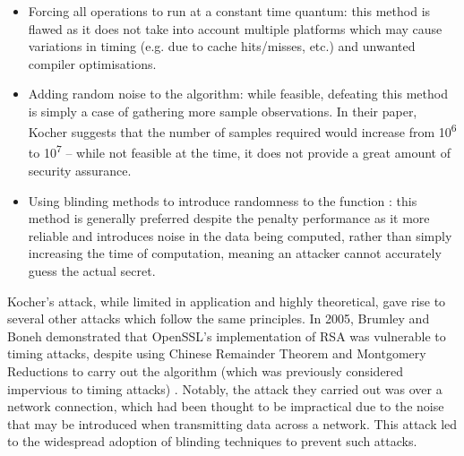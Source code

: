 \documentclass[a4paper,oneside,11pt]{article}
\begin{document}
\begin{itemize}
	\item{Forcing all operations to run at a constant time quantum: this
		method is flawed as it does not take into account multiple
		platforms which may cause variations in timing (e.g. due to
		cache hits/misses, etc.) and unwanted compiler optimisations.}
	\item{Adding random noise to the algorithm: while feasible, defeating
		this method is simply a case of gathering more sample
		observations. In their paper, Kocher suggests that the number
		of samples required would increase from 10\textsuperscript{6}
		to 10\textsuperscript{7} -- while not feasible at the time, it
		does not provide a great amount of security assurance.}
	\item{Using blinding methods to introduce randomness to the function
		\cite{A/Chaum-1983-Blinding}: this method is generally
		preferred despite the penalty performance as it more reliable
		and introduces noise in the data being computed, rather than
		simply increasing the time of computation, meaning an attacker
		cannot accurately guess the actual secret.}
\end{itemize}

Kocher's attack, while limited in application and highly theoretical, gave rise
to several other attacks which follow the same principles. In 2005, Brumley and
Boneh demonstrated that OpenSSL's implementation of RSA was vulnerable to
timing attacks, despite using Chinese Remainder Theorem and Montgomery
Reductions to carry out the algorithm (which was previously considered
impervious to timing attacks) \cite{A/Brumley-2005-Remote-TAs}. Notably, the
attack they carried out was over a network connection, which had been thought
to be impractical due to the noise that may be introduced when transmitting
data across a network. This attack led to the widespread adoption of blinding
techniques to prevent such attacks.
\end{document}
